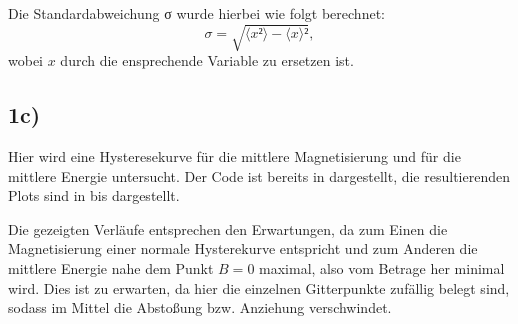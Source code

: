 Die Standardabweichung σ wurde hierbei wie folgt berechnet:
\begin{equation}
σ = \sqrt{\langle x²\rangle - \langle x \rangle²},
\end{equation}
wobei $x$ durch die ensprechende Variable zu ersetzen ist.

\subsection*{1c)}
Hier wird eine Hysteresekurve für die mittlere Magnetisierung und für die mittlere
Energie untersucht. Der Code ist bereits in  dargestellt, die resultierenden
Plots sind in  bis  dargestellt.


Die gezeigten Verläufe entsprechen den Erwartungen, da zum Einen die Magnetisierung
einer normale Hysterekurve entspricht und zum Anderen die mittlere Energie nahe
dem Punkt $B=0$ maximal, also vom Betrage her minimal wird. Dies ist zu erwarten,
da hier die einzelnen Gitterpunkte zufällig belegt sind, sodass im Mittel die
Abstoßung bzw. Anziehung verschwindet.